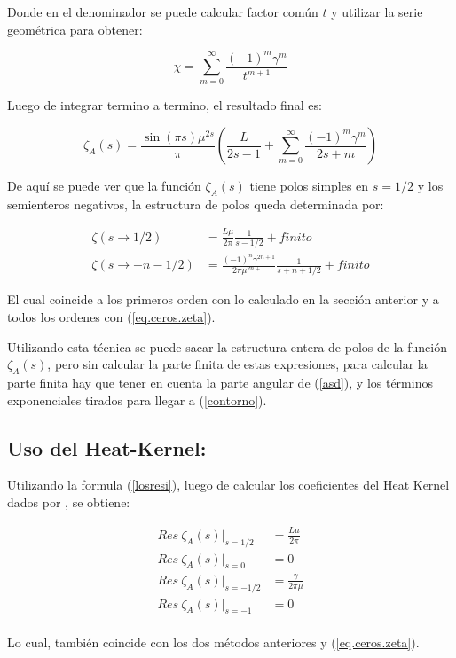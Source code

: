 Donde en el denominador se puede calcular factor común $t$ y utilizar la serie geométrica para obtener:

\begin{equation}
    \chi =   \sum _{m=0} ^{\infty} \frac{(-1) ^{m} \gamma ^{m} }{t ^{m+1}}
\label{eq:chi}
\end{equation}

Luego de integrar termino a termino, el resultado final es:

\begin{equation}
    \zeta _A (s) = 
    \frac{ \sin(\pi s) \mu ^{2s }}{\pi } 
    \left(
    \frac{L}{2s-1} + 
    \sum _{m=0} ^{\infty}
    \frac{(-1) ^{m} \gamma ^{m} }{2s+m}
    \right)
\label{eq.zeta.com}
\end{equation}

De aquí se puede ver que la función $\zeta _A (s)$ tiene polos simples en $s=1/2$ y los semienteros negativos, la estructura de polos queda determinada por:

\begin{equation}
\begin{aligned}
\zeta(s \rightarrow 1/2) &= \frac{L \mu }{2 \pi} \frac{1}{s-1/2} + finito \\
\zeta (s \rightarrow -n - 1/2)  &= \frac{ (-1) ^n \gamma ^{2n+1}  }{2 \pi \mu ^{2n + 1}} \frac{1}{s + n + 1/2} + finito
\end{aligned}
\end{equation}


El cual coincide a los primeros orden con lo calculado en la sección anterior  y a todos los ordenes con (\ref{eq.ceros.zeta}).

 Utilizando esta técnica se puede sacar la estructura entera de polos de la función $\zeta _A (s) $, pero sin calcular la parte finita de estas expresiones, para calcular la parte finita hay que tener en cuenta la parte angular de (\ref{asd}), y los términos exponenciales tirados para llegar a (\ref{contorno}).


\subsection{Uso del Heat-Kernel:}


Utilizando la formula (\ref{losresi}), luego de calcular los coeficientes del Heat Kernel dados por \cite{VASSILEVICH2003279}, se obtiene:



\begin{equation}
\begin{aligned}
Res \  \zeta _A (s)  | _{s=1/2} &= \frac{L \mu}{2 \pi} \\[5pt]
Res \  \zeta _A (s)  | _{s=0} &= 0 \\[5pt]
Res \ \zeta _A (s) | _{s=-1/2} &= \frac{\gamma}{2 \pi \mu} \\[5pt]
Res \  \zeta _A (s) | _{s=-1} &= 0 \\[5pt]
\end{aligned}
\end{equation}


Lo cual, también coincide con los dos métodos anteriores y (\ref{eq.ceros.zeta}).
